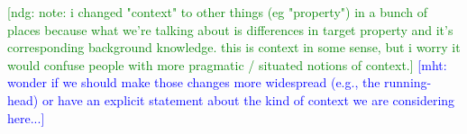 \documentclass[floatsintext,doc]{apa6}
\begin{document}


{\textcolor{Green}{[ndg: note: i changed "context" to other things (eg "property") in a bunch of places because what we're talking about is differences in target property and it's corresponding background knowledge. this is context in some sense, but i worry it would confuse people with more pragmatic / situated notions of context.]}}
{\textcolor{Blue}{[mht: wonder if we should make those changes more widespread (e.g., the running-head) or have an explicit statement about the kind of context we are considering here...]}}
\end{document}
